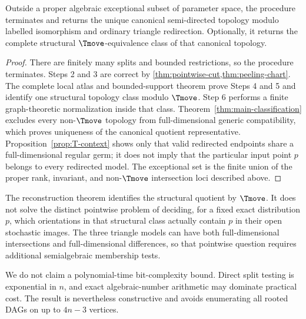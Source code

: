 \begin{theorem}\label{thm:reconstruction}
Outside a proper algebraic exceptional subset of parameter space, the procedure terminates and returns the unique canonical semi-directed topology modulo labelled isomorphism and ordinary triangle redirection.  Optionally, it returns the complete structural $\Tmove$-equivalence class of that canonical topology.
\end{theorem}

\begin{proof}
There are finitely many splits and bounded restrictions, so the procedure terminates.  Steps 2 and 3 are correct by \cref{thm:pointwise-cut,thm:peeling-chart}.  The complete local atlas and bounded-support theorem prove Steps 4 and 5 and identify one structural topology class modulo $\Tmove$.  Step 6 performs a finite graph-theoretic normalization inside that class.  Theorem~\ref{thm:main-classification} excludes every non-$\Tmove$ topology from full-dimensional generic compatibility, which proves uniqueness of the canonical quotient representative.  Proposition~\ref{prop:T-context} shows only that valid redirected endpoints share a full-dimensional regular germ; it does not imply that the particular input point $p$ belongs to every redirected model.  The exceptional set is the finite union of the proper rank, invariant, and non-$\Tmove$ intersection loci described above.
\end{proof}

\begin{remark}\label{rem:pointwise-T}
The reconstruction theorem identifies the structural quotient by $\Tmove$.  It does not solve the distinct pointwise problem of deciding, for a fixed exact distribution $p$, which orientations in that structural class actually contain $p$ in their open stochastic images.  The three triangle models can have both full-dimensional intersections and full-dimensional differences, so that pointwise question requires additional semialgebraic membership tests.
\end{remark}

We do not claim a polynomial-time bit-complexity bound.  Direct split testing is exponential in $n$, and exact algebraic-number arithmetic may dominate practical cost.  The result is nevertheless constructive and avoids enumerating all rooted DAGs on up to $4n-3$ vertices.
